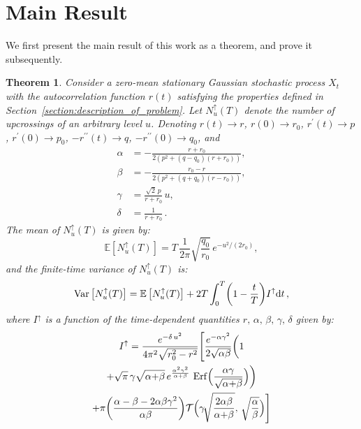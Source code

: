 \documentclass[journal]{IEEEtran}
\theoremstyle{plain}
\newtheorem{theorem}{Theorem}[section]
\theoremstyle{definition}
\theoremstyle{remark}
\newcommand{\E}{\mathbb{E}}
\newcommand{\Ot}{\mathcal{T}}
\newcommand{\Erf}{\operatorname{Erf}}
\newcommand{\Iup}{I^\uparrow}
\newcommand{\Nup}{N_u^{\uparrow}(T)}
\newcommand{\dd}{\mathrm{d}}
\newcommand{\rp}{r^\prime}
\newcommand{\rpp}{r^{\prime\prime}}
\begin{document}
\section{Main Result}
\label{section:main_result_upcrossing}
We first present the main result of this work as a theorem, and prove it subsequently.
\begin{theorem}
\label{thrm:main_theorem_upcrossing}
Consider a zero-mean stationary Gaussian stochastic process $X_t$ with the autocorrelation function $r(t)$ satisfying the properties defined in Section~\ref{section:description_of_problem}. Let $\Nup$ denote the number of upcrossings of an arbitrary level $u$.
Denoting $r(t)\rightarrow r$, $r(0)\rightarrow r_0$, $\rp(t) \rightarrow p$, $\rp(0)\rightarrow p_0$, $-\rpp(t) \rightarrow q$, $-\rpp(0)\rightarrow q_0$, and 
\begin{equation}
\begin{aligned}
\alpha &=-\frac{r+r_0}{2\left(p^2+(q-q_0)(r+r_0)\right)},\\
\beta &= -\frac{r_0-r}{2\left(p^2+(q+q_0)(r-r_0)\right)},\\
\gamma &=\frac{\sqrt{2}\,p}{r+r_0}\,u,\\
\delta &= \frac{1}{r+r_0}\,.
\end{aligned}
\end{equation}
The mean of $\Nup$ is given by:
\begin{equation}
    \E\left[\Nup\right] = T\, \frac{1}{2\pi}\sqrt{\frac{q_0}{r_0}} \, e^{-u^2/(2r_0)}, \label{eq:rice_formula_gaussian}
\end{equation}
and the finite-time variance of $\Nup$ is:
\begin{equation}
    \textnormal{Var}\left[\Nup\right] = \E\left[\Nup\right] + 2T \int_{0}^T \biggl(1-\frac{t}{T}\biggr)  \Iup  \dd t  \,,\label{eq:variance_finite_time_final}
\end{equation}
where $\Iup$ is a function of the time-dependent quantities $r, \, \alpha, \, \beta, \, \gamma, \, \delta$ given by:
\begin{multline}
    \Iup = \frac{e^{-\delta\,u^2}}{4\pi^2 \sqrt{r_0^2-r^2}} \Biggl[\frac{e^{-\alpha \gamma^2}}{2\sqrt{\alpha\beta}} \biggl(1 \\
    + \sqrt{\pi} \, \gamma \sqrt{\alpha{+}\beta} \, e^{\frac{\alpha^2 \gamma^2}{\alpha + \beta}} \, \Erf\Bigl(\frac{\alpha \gamma}{\sqrt{\alpha{+}\beta}}\Bigr)\biggr) \\
    + \pi \biggl(\frac{\alpha - \beta - 2\alpha\beta\gamma^2}{\alpha\beta}\biggr) \Ot\Bigl(\gamma\!\sqrt{\frac{2\alpha\beta}{\alpha{+}\beta}},\, \sqrt{\frac{\alpha}{\beta}}\Bigr)\Biggr] \\

\end{multline}
\end{theorem}
\end{document}
